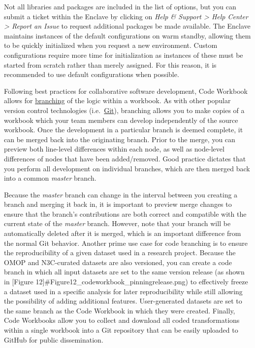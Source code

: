 \documentclass[
  letterpaper,
  DIV=11,
  numbers=noendperiod]{scrreprt}
\begin{document}
Not all libraries and packages are included in the list of options, but
you can submit a ticket within the Enclave by clicking on \emph{Help \&
Support \textgreater{} Help Center \textgreater{} Report an Issue} to
request additional packages be made available. The Enclave maintains
instances of the default configurations on warm standby, allowing them
to be quickly initialized when you request a new environment. Custom
configurations require more time for initialization as instances of
these must be started from scratch rather than merely assigned. For this
reason, it is recommended to use default configurations when possible.

Following best practices for collaborative software development, Code
Workbook allows for
\href{https://www.palantir.com/docs/foundry/code-workbook/branching-overview/}{branching}
of the logic within a workbook. As with other popular version control
technologies (i.e.~\href{https://git-scm.com/}{Git}), branching allows
you to make copies of a workbook which your team members can develop
independently of the source workbook. Once the development in a
particular branch is deemed complete, it can be merged back into the
originating branch. Prior to the merge, you can preview both line-level
differences within each node, as well as node-level differences of nodes
that have been added/removed. Good practice dictates that you perform
all development on individual branches, which are then merged back into
a common \emph{master} branch.

Because the \emph{master} branch can change in the interval between you
creating a branch and merging it back in, it is important to preview
merge changes to ensure that the branch's contributions are both correct
and compatible with the current state of the \emph{master} branch.
However, note that your branch will be automatically deleted after it is
merged, which is an important difference from the normal Git behavior.
Another prime use case for code branching is to ensure the
reproducibility of a given dataset used in a research project. Because
the OMOP and N3C-curated datasets are also versioned, you can create a
code branch in which all input datasets are set to the same version
release (as shown in {[}Figure
12{]}\#Figure12\_codeworkbook\_pinningrelease.png) to effectively freeze
a dataset used in a specific analysis for later reproducibility while
still allowing the possibility of adding additional features.
User-generated datasets are set to the same branch as the Code Workbook
in which they were created. Finally, Code Workbooks allow you to collect
and download all coded transformations within a single workbook into a
Git repository that can be easily uploaded to GitHub for public
dissemination.
\end{document}
